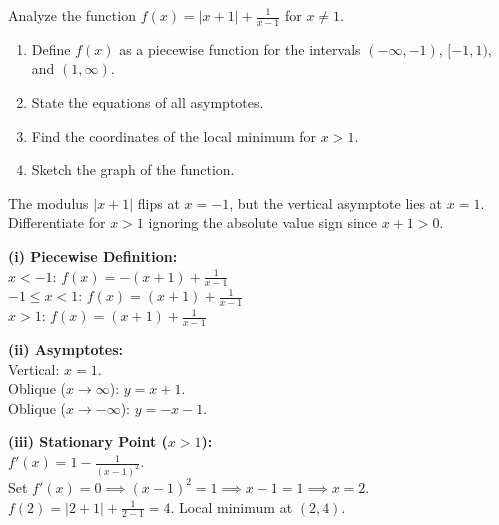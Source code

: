 \begin{problem}[Investigation of $f(x) = |x + 1| + \frac{1}{x - 1}$]
Analyze the function $f(x) = |x + 1| + \frac{1}{x - 1}$ for $x \neq 1$.
\begin{enumerate}[label=(\roman*)]
\item Define $f(x)$ as a piecewise function for the intervals $(-\infty, -1)$, $[-1, 1)$, and $(1, \infty)$.
\item State the equations of all asymptotes.
\item Find the coordinates of the local minimum for $x > 1$.
\item Sketch the graph of the function.
\end{enumerate}

\begin{center}
\end{center}
\end{problem}

\begin{hint}
The modulus $|x+1|$ flips at $x = -1$, but the vertical asymptote lies at $x = 1$. Differentiate for $x>1$ ignoring the absolute value sign since $x+1 > 0$.
\end{hint}

\begin{solution}
\textbf{(i) Piecewise Definition:}\\
$x < -1$: $f(x) = -(x+1) + \frac{1}{x-1}$\\
$-1 \le x < 1$: $f(x) = (x+1) + \frac{1}{x-1}$\\
$x > 1$: $f(x) = (x+1) + \frac{1}{x-1}$

\textbf{(ii) Asymptotes:}\\
Vertical: $x = 1$.\\
Oblique ($x \to \infty$): $y = x + 1$.\\
Oblique ($x \to -\infty$): $y = -x - 1$.

\textbf{(iii) Stationary Point ($x > 1$):}\\
$f'(x) = 1 - \frac{1}{(x-1)^2}$. \\
Set $f'(x) = 0 \implies (x-1)^2 = 1 \implies x-1 = 1 \implies x = 2$.
$f(2) = |2+1| + \frac{1}{2-1} = 4$. Local minimum at $(2, 4)$.
\end{solution}

